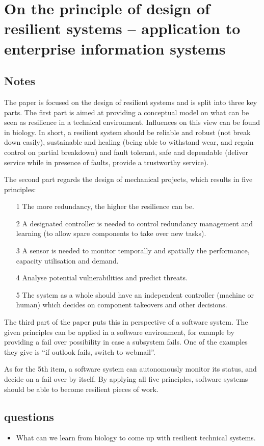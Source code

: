 \chapter{On the principle of design of resilient systems -- application to enterprise information systems \cite{zhang2010principle}}
\section{Notes}
The paper is focused on the design of resilient systems and is split into three key parts.
The first part is aimed at providing a conceptual model on what can be seen as resilience in a technical environment. 
Influences on this view can be found in biology. 
In short, a resilient system should be reliable and robust (not break down easily), sustainable and healing (being able to withstand wear, and regain control on partial breakdown) and fault tolerant, safe and dependable (deliver service while in presence of faults, provide a trustworthy service).

The second part regards the design of mechanical projects, which results in five principles:
\begin{itemize}
  \setlength{\itemsep}{0pt}
  \setlength{\parskip}{0pt}
  \setlength{\parsep}{0pt}
  \item[1] The more redundancy, the higher the resilience can be.
  \item[2] A designated controller is needed to control redundancy management and learning (to allow spare components to take over new tasks).
  \item[3] A sensor is needed to monitor temporally and spatially the performance, capacity utilisation and demand.
  \item[4] Analyse potential vulnerabilities and predict threats.
  \item[5] The system as a whole should have an independent controller (machine or human) which decides on component takeovers and other decisions.
\end{itemize}

The third part of the paper puts this in perspective of a software system.
The given principles can be applied in a software environment, for example by providing a fail over possibility in case a subsystem fails. 
One of the examples they give is ``if outlook fails, switch to webmail''.

As for the 5th item, a software system can autonomously monitor its status, and decide on a fail over by itself.
By applying all five principles, software systems should be able to become resilient pieces of work.

\section{questions}
\begin{itemize}
  \item What can we learn from biology to come up with resilient technical systems.
\end{itemize}

